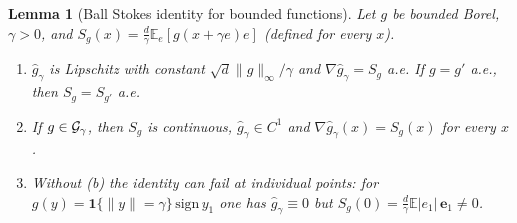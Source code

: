 \documentclass[11pt,a4paper]{article}
\numberwithin{equation}{section}
\newtheorem{lemma}[theorem]{Lemma}
\theoremstyle{definition}
\theoremstyle{remark}
\newcommand{\E}{\mathbb E}\newcommand{\R}{\mathbb R}\newcommand{\N}{\mathbb N}\newcommand{\Prob}{\mathbb P}
\newcommand{\norm}[1]{\lVert #1\rVert}\newcommand{\abs}[1]{\lvert #1\rvert}\newcommand{\ip}[2]{\langle #1,#2\rangle}
\begin{document}
\begin{lemma}[Ball Stokes identity for bounded functions]\label{lem:stokes}
Let $g$ be bounded Borel, $\gamma>0$, and $S_g(x)=\frac d\gamma\E_e[g(x+\gamma e)e]$ (defined for every $x$).
\begin{enumerate}[label=(\alph*)]
\item $\hat g_\gamma$ is Lipschitz with constant $\sqrt d\norm g_\infty/\gamma$ and $\nabla\hat g_\gamma=S_g$ a.e. If $g=g'$ a.e., then $S_g=S_{g'}$ a.e.
\item If $g\in\mathcal G_\gamma$, then $S_g$ is continuous, $\hat g_\gamma\in C^1$ and $\nabla\hat g_\gamma(x)=S_g(x)$ for every $x$.
\item Without (b) the identity can fail at individual points: for $g(y)=\mathbf 1\{\norm y=\gamma\}\,\mathrm{sign}\,y_1$ one has $\hat g_\gamma\equiv0$ but $S_g(0)=\frac d\gamma\E\abs{e_1}\,\mathbf e_1\ne0$.
\end{enumerate}
\end{lemma}
\end{document}
